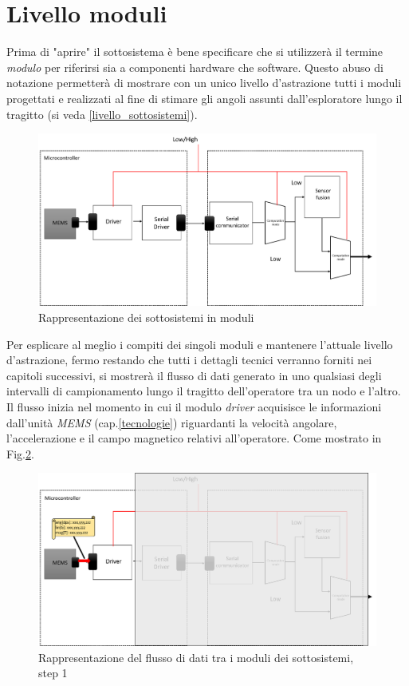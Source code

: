 \section{Livello moduli}
\label{livello_moduli}
Prima di "aprire" il sottosistema è bene specificare che si utilizzerà il termine \textit{modulo} per riferirsi sia a componenti hardware che software. Questo abuso di notazione permetterà di mostrare con un unico livello d'astrazione tutti i moduli progettati e realizzati al fine di stimare gli angoli assunti dall'esploratore lungo il tragitto (si veda \ref{livello_sottosistemi}).
\begin{figure}[H]  
\includegraphics[scale=0.3 ]{DescrizioneDelSistema/sistema_liv2.png}
\caption{Rappresentazione dei sottosistemi in moduli}
\label{fig:sistema_liv2}
\end{figure}
Per esplicare al meglio i compiti dei singoli moduli e mantenere l'attuale livello d'astrazione, fermo restando che tutti i dettagli tecnici verranno forniti nei capitoli successivi, si mostrerà il flusso di dati generato in uno qualsiasi degli intervalli di campionamento lungo il tragitto dell'operatore tra un nodo e l'altro.\\ 
Il flusso inizia nel momento in cui il modulo \textit{driver} acquisisce le informazioni dall'unità \textit{MEMS} (cap.\ref{tecnologie}) riguardanti la velocità angolare, l'accelerazione e il campo magnetico relativi all'operatore. Come mostrato in Fig.\ref{fig:flusso1}. 
\begin{figure}[H] 
	\centering 
	\includegraphics[scale=0.25 ]{DescrizioneDelSistema/flusso1.png}
	\caption{Rappresentazione del flusso di dati tra i moduli dei sottosistemi, step 1}
	\label{fig:flusso1}
\end{figure}
